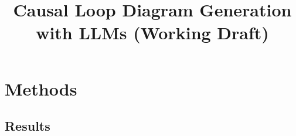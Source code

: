 \documentclass[12pt]{article}
\title{Causal Loop Diagram Generation with LLMs (Working Draft)}
\author{}
\date{}
\begin{document}
\maketitle



\tableofcontents
\newpage







\section{Methods}
\label{sec:methods}
\begingroup
\let\section\subsection
\let\subsection\subsubsection
\let\subsubsection\paragraph

\endgroup

\section{Results}
\label{sec:results}
\begingroup
\let\section\subsection
\let\subsection\subsubsection
\let\subsubsection\paragraph

\endgroup









\end{document}
